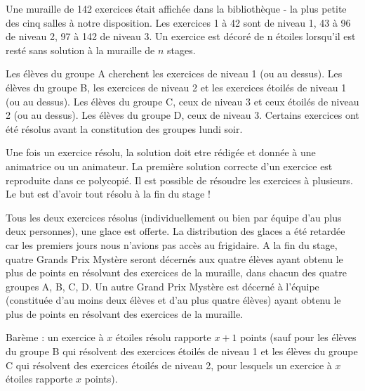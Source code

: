 Une muraille de 142 exercices était affichée dans la bibliothèque - la plus petite des cinq salles à notre disposition. Les exercices 1 à 42 sont de niveau 1, 43 à 96 de niveau 2, 97 à 142 de niveau 3. Un exercice est décoré de n étoiles lorsqu'il est resté sans solution à la muraille de $n$ stages.

Les élèves du groupe A cherchent les exercices de niveau 1 (ou au dessus). Les élèves du groupe B, les exercices de niveau 2 et les exercices étoilés de niveau 1 (ou au dessus). Les élèves du groupe C, ceux de niveau 3 et ceux étoilés de niveau 2 (ou au dessus). Les élèves du groupe D, ceux de niveau 3. Certains exercices ont été résolus avant la constitution des groupes lundi soir.

Une fois un exercice résolu, la solution doit etre rédigée et donnée à une animatrice ou un animateur. La première solution correcte d'un exercice est reproduite dans ce polycopié. Il est possible de résoudre les exercices à plusieurs. Le but est d'avoir tout résolu à la fin du stage !

Tous les deux exercices résolus (individuellement ou bien par équipe d'au plus deux personnes), une glace est offerte. La distribution des glaces a été retardée car les premiers jours nous n'avions pas accès au frigidaire. A la fin du stage, quatre Grands Prix Mystère seront décernés aux quatre élèves ayant obtenu le plus de points en résolvant des exercices de la muraille, dans chacun des quatre groupes A, B, C, D. Un autre Grand Prix Mystère est décerné à l'équipe (constituée d'au moins deux élèves et d'au plus quatre élèves) ayant obtenu le plus de points en résolvant des exercices de la muraille.

Barème : un exercice à $x$ étoiles résolu rapporte $x+1$ points (sauf pour les élèves du groupe B qui résolvent des exercices étoilés de niveau 1 et les élèves du groupe C qui résolvent des exercices étoilés de niveau 2, pour lesquels un exercice à $x$ étoiles rapporte $x$ points).

